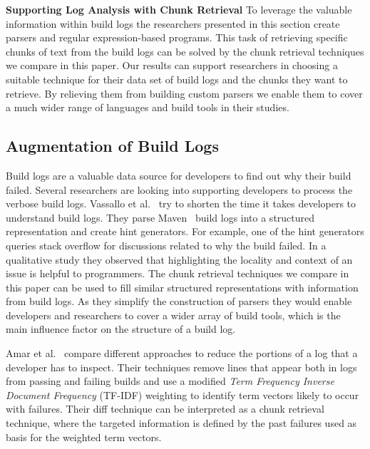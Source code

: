 \noindent
\textbf{Supporting Log Analysis with Chunk Retrieval}
To leverage the valuable information within build logs the researchers presented
in this section create parsers and regular expression-based programs.
This task of retrieving specific chunks of text from the build logs can be
solved by the chunk retrieval techniques we compare in this paper.
Our results can support researchers in choosing a suitable technique for their
data set of build logs and the chunks they want to retrieve.
By relieving them from building custom parsers we enable them to cover a much
wider range of languages and build tools in their studies.


\subsection{Augmentation of Build Logs}
\label{sec:rw-bl-analysis}
Build logs are a valuable data source for developers to find out why their build failed.
Several researchers are looking into supporting developers to process the verbose build logs.
Vassallo et al.~\cite{vassallo2018un-break} try to shorten the time it takes developers to understand build logs.
They parse Maven~\cite{maven2019website} build logs into a structured representation and create hint generators.
For example, one of the hint generators queries stack overflow for discussions related to why the build failed.
In a qualitative study they observed that highlighting the locality and context of an issue is helpful to programmers.
The chunk retrieval techniques we compare in this paper can be used to fill similar structured representations with information from build logs.
As they simplify the construction of parsers they would enable developers and researchers to cover a wider array of build tools, which is the main influence factor on the structure of a build log.

Amar et al.~\cite{amar2019mining} compare different approaches to reduce the portions of a log that a developer has to inspect.
Their techniques remove lines that appear both in logs from passing and failing builds and use a modified \emph{Term Frequency Inverse Document Frequency} (TF-IDF) weighting to identify term vectors likely to occur with failures.
Their diff technique can be interpreted as a chunk retrieval technique, where the targeted information is defined by the past failures used as basis for the weighted term vectors.

